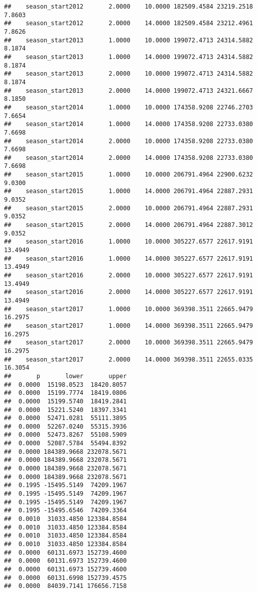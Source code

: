 \documentclass[
]{book}
\begin{document}
\begin{verbatim}
##    season_start2012       2.0000    10.0000 182509.4584 23219.2518  7.8603
##    season_start2012       2.0000    14.0000 182509.4584 23212.4961  7.8626
##    season_start2013       1.0000    10.0000 199072.4713 24314.5882  8.1874
##    season_start2013       1.0000    14.0000 199072.4713 24314.5882  8.1874
##    season_start2013       2.0000    10.0000 199072.4713 24314.5882  8.1874
##    season_start2013       2.0000    14.0000 199072.4713 24321.6667  8.1850
##    season_start2014       1.0000    10.0000 174358.9208 22746.2703  7.6654
##    season_start2014       1.0000    14.0000 174358.9208 22733.0380  7.6698
##    season_start2014       2.0000    10.0000 174358.9208 22733.0380  7.6698
##    season_start2014       2.0000    14.0000 174358.9208 22733.0380  7.6698
##    season_start2015       1.0000    10.0000 206791.4964 22900.6232  9.0300
##    season_start2015       1.0000    14.0000 206791.4964 22887.2931  9.0352
##    season_start2015       2.0000    10.0000 206791.4964 22887.2931  9.0352
##    season_start2015       2.0000    14.0000 206791.4964 22887.3012  9.0352
##    season_start2016       1.0000    10.0000 305227.6577 22617.9191 13.4949
##    season_start2016       1.0000    14.0000 305227.6577 22617.9191 13.4949
##    season_start2016       2.0000    10.0000 305227.6577 22617.9191 13.4949
##    season_start2016       2.0000    14.0000 305227.6577 22617.9191 13.4949
##    season_start2017       1.0000    10.0000 369398.3511 22665.9479 16.2975
##    season_start2017       1.0000    14.0000 369398.3511 22665.9479 16.2975
##    season_start2017       2.0000    10.0000 369398.3511 22665.9479 16.2975
##    season_start2017       2.0000    14.0000 369398.3511 22655.0335 16.3054
##       p       lower       upper
##  0.0000  15198.0523  18420.8057
##  0.0000  15199.7774  18419.0806
##  0.0000  15199.5740  18419.2841
##  0.0000  15221.5240  18397.3341
##  0.0000  52471.0281  55111.3895
##  0.0000  52267.0240  55315.3936
##  0.0000  52473.8267  55108.5909
##  0.0000  52087.5784  55494.8392
##  0.0000 184389.9668 232078.5671
##  0.0000 184389.9668 232078.5671
##  0.0000 184389.9668 232078.5671
##  0.0000 184389.9668 232078.5671
##  0.1995 -15495.5149  74209.1967
##  0.1995 -15495.5149  74209.1967
##  0.1995 -15495.5149  74209.1967
##  0.1995 -15495.6546  74209.3364
##  0.0010  31033.4850 123384.8584
##  0.0010  31033.4850 123384.8584
##  0.0010  31033.4850 123384.8584
##  0.0010  31033.4850 123384.8584
##  0.0000  60131.6973 152739.4600
##  0.0000  60131.6973 152739.4600
##  0.0000  60131.6973 152739.4600
##  0.0000  60131.6998 152739.4575
##  0.0000  84039.7141 176656.7158

\end{verbatim}
\end{document}
